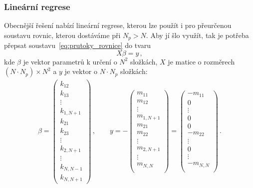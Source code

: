 \subsubsection{Lineární regrese}
Obecnější řešení nabízí lineární regrese, kterou lze použít i pro přeurčenou soustavu rovnic, kterou dostáváme při $N_p>N$. Aby jí šlo využít, tak je potřeba přepsat soustavu~\eqref{eq:prutoky_rovnice} do tvaru 
\begin{equation}
    X\beta=y\,,
    \label{eq:prutoky_regrese}
\end{equation}
kde $\beta$ je vektor parametrů k určení o $N^2$ složkách, $X$ je matice o rozměrech $(N\cdot N_p)\times N^2$ a $y$ je vektor o $N\cdot N_p$ složkách:
\begin{align}
    \beta=
    \begin{pmatrix}
        k_{12}\\
        k_{13}\\
        \vdots\\
        k_{1,N+1}\\
        k_{21}\\
        k_{23}\\
        \vdots\\
        k_{2,N+1}\\
        \vdots\\
        k_{N,N-1}\\
        k_{N,N+1}
    \end{pmatrix}\,,\qquad y=
    -\begin{pmatrix}
        m_{11}\\
        m_{12}\\
        \vdots\\
        m_{1,N+1}\\
        m_{21}\\
        m_{22}\\
        \vdots\\
        m_{2,N+1}\\
        \vdots\\
        m_{N,N}\\
    \end{pmatrix}=
    \begin{pmatrix}
        -m_{11}\\
        0\\
        \vdots\\
        0\\
        0\\
        -m_{22}\\
        \vdots\\
        0\\
        \vdots\\
        -m_{N,N}\\
    \end{pmatrix}
    \,.
\end{align}
